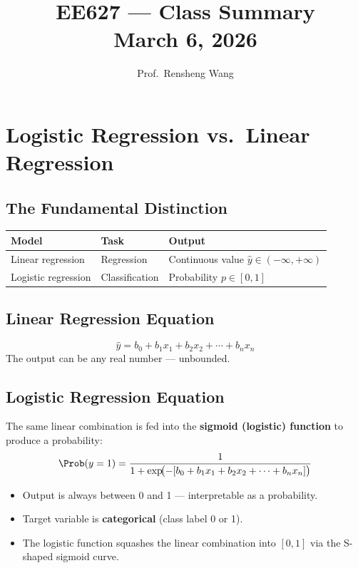 \documentclass[11pt]{article}
\title{\textbf{EE627 --- Class Summary}\\[0.4em]
       \large March 6, 2026}
\author{Prof.\ Rensheng Wang}
\date{}
\begin{document}
\maketitle
\tableofcontents
\newpage

\section{Logistic Regression vs.\ Linear Regression}

\subsection{The Fundamental Distinction}
\begin{center}
\begin{tabular}{@{}lll@{}}
\toprule
\textbf{Model} & \textbf{Task} & \textbf{Output} \\
\midrule
Linear regression  & Regression      & Continuous value $\hat{y} \in (-\infty, +\infty)$ \\
Logistic regression & Classification & Probability $p \in [0, 1]$ \\
\bottomrule
\end{tabular}
\end{center}

\subsection{Linear Regression Equation}
\[
\hat{y} = b_0 + b_1 x_1 + b_2 x_2 + \cdots + b_n x_n
\]
The output can be any real number --- unbounded.

\subsection{Logistic Regression Equation}
The same linear combination is fed into the \textbf{sigmoid (logistic) function}
to produce a probability:
\[
\Prob(y = 1) = \frac{1}{1 + \exp\!\bigl(-[b_0 + b_1 x_1 + b_2 x_2 + \cdots + b_n x_n]\bigr)}
\]

\begin{itemize}
    \item Output is always between 0 and 1 --- interpretable as a probability.
    \item Target variable is \textbf{categorical} (class label 0 or 1).
    \item The logistic function squashes the linear combination into
      $[0,1]$ via the S-shaped sigmoid curve.
\end{itemize}
\end{document}
